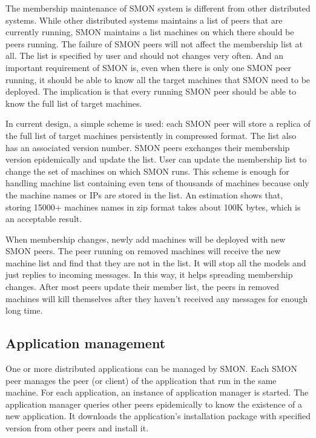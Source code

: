 The membership maintenance of SMON system is different from
other distributed systems. While other distributed systems
maintains a list of peers that are currently running, SMON
maintains a list machines on which there should be peers
running. The failure of SMON peers will not affect the
membership list at all. The list is specified by user and
should not changes very often. And an important requirement
of SMON is, even when there is only one SMON peer running,
it should be able to know all the target machines that SMON
need to be deployed.  The implication is that every running
SMON peer should be able to know the full list of target
machines.

In current design, a simple scheme is used: each SMON peer
will store a replica of the full list of target machines
persistently in compressed format. The list also has an
associated version number. SMON peers exchanges their
membership version epidemically and update the list. User
can update the membership list to change the set of machines
on which SMON runs.
This scheme is enough for handling machine list containing
even tens of thousands of machines because only the machine
names or IPs are stored in the list.  An estimation shows
that, storing 15000+ machines names in zip format takes
about 100K bytes, which is an acceptable result.

When membership changes, newly add machines will be deployed
with new SMON peers. The peer running on removed machines
will receive the new machine list and find that they are not
in the list. It will stop all the models  and
just replies to incoming messages. In this way, it helps
spreading membership changes. After most peers update their
member list, the peers in removed machines will kill
themselves after they haven't received any messages for
enough long time.

\subsection{Application management}

One or more distributed applications can be managed by SMON.
Each SMON peer manages the peer (or client) of the
application that run in the same machine. For each
application, an instance of application manager is started.
The application manager queries other peers epidemically to
know the existence of a new application. It downloads the
application's installation package with specified version
from other peers and install it. 

